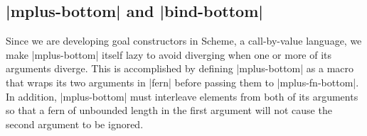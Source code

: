 \subsection{\protect\scheme|mplus-bottom| and \protect\scheme|bind-bottom|}\label{mplus-bottom-and-bind-bottom}

Since we are developing goal constructors in Scheme, a call-by-value language,
we make \scheme|mplus-bottom| itself lazy to avoid diverging when one or
more of its arguments diverge. This is accomplished by defining \scheme|mplus-bottom| as a
macro that wraps its two arguments in \scheme|fern| before passing
them to \scheme|mplus-fn-bottom|. In addition, \scheme|mplus-bottom| must interleave
elements from both of its arguments so that a fern of unbounded length
in the first argument will not cause the second argument to be
ignored.











